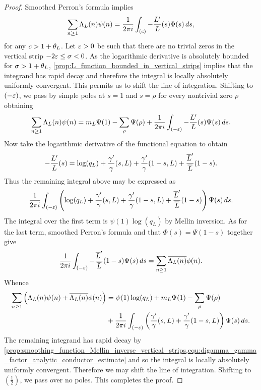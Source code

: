     \begin{proof}
      Smoothed Perron's formula implies
      \[
        \sum_{n \ge 1}\Lambda_{L}(n)\psi(n) = \frac{1}{2\pi i}\int_{(c)}-\frac{L'}{L}(s)\Phi(s)\,ds,
      \]
      for any \(c > 1+\theta_{L}\). Let \(\varepsilon > 0\) be such that there are no trivial zeros in the vertical strip \(-2\varepsilon \le \sigma < 0\). As the logarithmic derivative is absolutely bounded for \(\sigma > 1+\theta_{L}\), \cref{prop:L_function_bounded_in_vertical_strips} implies that the integrand has rapid decay and therefore the integral is locally absolutely uniformly convergent. This permits us to shift the line of integration. Shifting to \((-\varepsilon)\), we pass by simple poles at \(s = 1\) and \(s = \rho\) for every nontrivial zero \(\rho\) obtaining
      \[
        \sum_{n \ge 1}\Lambda_{L}(n)\psi(n) = m_{L}\Psi(1)-\sum_{\rho}\Psi(\rho)+\frac{1}{2\pi i}\int_{(-\varepsilon)}-\frac{L'}{L}(s)\Psi(s)\,ds.
      \]
      Now take the logarithmic derivative of the functional equation to obtain
      \[
        -\frac{L'}{L}(s) = \log(q_{L})+\frac{\gamma'}{\gamma}(s,L)+\frac{\gamma'}{\gamma}(1-s,L)+\frac{\overline{L}'}{\overline{L}}(1-s).
      \]
      Thus the remaining integral above may be expressed as
      \[
        \frac{1}{2\pi i}\int_{(-\varepsilon)}\left(\log(q_{L})+\frac{\gamma'}{\gamma}(s,L)+\frac{\gamma'}{\gamma}(1-s,L)+\frac{\overline{L}'}{\overline{L}}(1-s)\right)\Psi(s)\,ds.
      \]
      The integral over the first term is \(\psi(1)\log(q_{L})\) by Mellin inversion. As for the last term, smoothed Perron's formula and that \(\Phi(s) = \Psi(1-s)\) together give
      \[
        \frac{1}{2\pi i}\int_{(-\varepsilon)}-\frac{\overline{L}'}{\overline{L}}(1-s)\Psi(s)\,ds = \sum_{n \ge 1}\overline{\Lambda_{L}(n)}\phi(n).
      \]
      Whence
      \begin{align*}
        \sum_{n \ge 1}\left(\Lambda_{L}(n)\psi(n)+\overline{\Lambda_{L}(n)}\phi(n)\right) &= \psi(1)\log(q_{L})+m_{L}\Psi(1)-\sum_{\rho}\Psi(\rho) \\
        &+ \frac{1}{2\pi i}\int_{(-\varepsilon)}\left(\frac{\gamma'}{\gamma}(s,L)+\frac{\gamma'}{\gamma}(1-s,L)\right)\Psi(s)\,ds.
      \end{align*}
      The remaining integrand has rapid decay by \cref{prop:smoothing_function_Mellin_inverse_vertical_strips,equ:digamma_gamma_factor_analytic_conductor_estimate} and so the integral is locally absolutely uniformly convergent. Therefore we may shift the line of integration. Shifting to \(\left(\frac{1}{2}\right)\), we pass over no poles. This completes the proof. 
    \end{proof}

